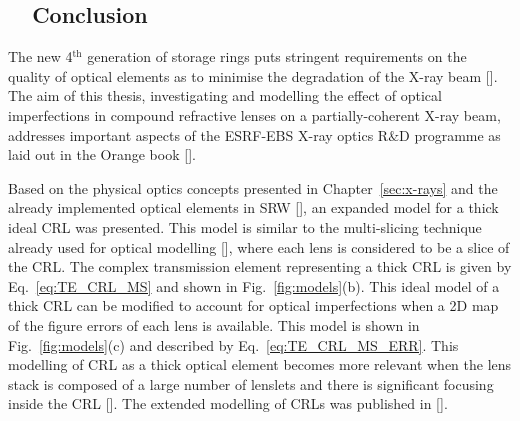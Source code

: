 
\begin{refsection}\renewcommand{\thechapter}{7.en}
\chapter{~~Conclusion}\label{sec:conclusion_en}

The new 4$^\text{th}$ generation of storage rings puts stringent requirements on the quality of optical elements as to minimise the degradation of the X-ray beam [\cite{Schroer2014,Yabashi2014}]. The aim of this thesis, investigating and modelling the effect of optical imperfections in compound refractive lenses on a partially-coherent X-ray beam, addresses important aspects of the ESRF-EBS X-ray optics R$\&$D programme as laid out in the Orange book [\cite{orangebook}]. 

Based on the physical optics concepts presented in Chapter~\ref{sec:x-rays} and the already implemented optical elements in SRW [\cite{Baltser2011}], an expanded model for a thick ideal CRL was presented. This model is similar to the multi-slicing technique already used for optical modelling [\cite{Li2017,Ali2020}], where each lens is considered to be a slice of the CRL. The complex transmission element representing a thick CRL is given by Eq.~\ref{eq:TE_CRL_MS} and shown in Fig.~\ref{fig:models}(b). This ideal model of a thick CRL can be modified to account for optical imperfections when a 2D map of the figure errors of each lens is available. This model is shown in Fig.~\ref{fig:models}(c) and described by Eq.~\ref{eq:TE_CRL_MS_ERR}. This modelling of CRL as a thick optical element becomes more relevant when the lens stack is composed of a large number of lenslets and there is significant focusing inside the CRL [\cite{Schroer2005}]. The extended modelling of CRLs was published in [\cite{Celestre2020}].


\end{refsection}
